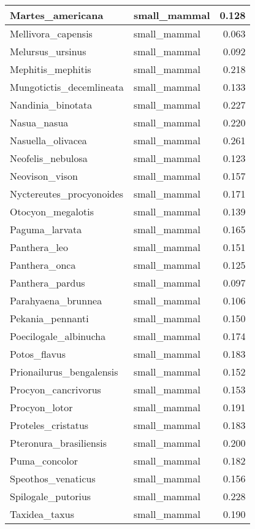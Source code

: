 \begin{table}
\begin{tabular}[t]{l|l|r}
\hline
Martes\_americana & small\_mammal & 0.128\\
\hline
Mellivora\_capensis & small\_mammal & 0.063\\
\hline
Melursus\_ursinus & small\_mammal & 0.092\\
\hline
Mephitis\_mephitis & small\_mammal & 0.218\\
\hline
Mungotictis\_decemlineata & small\_mammal & 0.133\\
\hline
Nandinia\_binotata & small\_mammal & 0.227\\
\hline
Nasua\_nasua & small\_mammal & 0.220\\
\hline
Nasuella\_olivacea & small\_mammal & 0.261\\
\hline
Neofelis\_nebulosa & small\_mammal & 0.123\\
\hline
Neovison\_vison & small\_mammal & 0.157\\
\hline
Nyctereutes\_procyonoides & small\_mammal & 0.171\\
\hline
Otocyon\_megalotis & small\_mammal & 0.139\\
\hline
Paguma\_larvata & small\_mammal & 0.165\\
\hline
Panthera\_leo & small\_mammal & 0.151\\
\hline
Panthera\_onca & small\_mammal & 0.125\\
\hline
Panthera\_pardus & small\_mammal & 0.097\\
\hline
Parahyaena\_brunnea & small\_mammal & 0.106\\
\hline
Pekania\_pennanti & small\_mammal & 0.150\\
\hline
Poecilogale\_albinucha & small\_mammal & 0.174\\
\hline
Potos\_flavus & small\_mammal & 0.183\\
\hline
Prionailurus\_bengalensis & small\_mammal & 0.152\\
\hline
Procyon\_cancrivorus & small\_mammal & 0.153\\
\hline
Procyon\_lotor & small\_mammal & 0.191\\
\hline
Proteles\_cristatus & small\_mammal & 0.183\\
\hline
Pteronura\_brasiliensis & small\_mammal & 0.200\\
\hline
Puma\_concolor & small\_mammal & 0.182\\
\hline
Speothos\_venaticus & small\_mammal & 0.156\\
\hline
Spilogale\_putorius & small\_mammal & 0.228\\
\hline
Taxidea\_taxus & small\_mammal & 0.190\\

\end{tabular}
\end{table}
